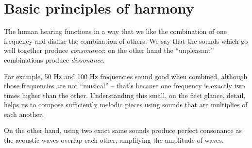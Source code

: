 \documentclass[../sparc.tex]{subfiles}
\begin{document}
\newpage
\section{Basic principles of harmony}

The human hearing functions in a way that we like the combination of one
frequency and dislike the combination of others.  We say that the sounds which
go well together produce \emph{consonance}; on the other hand the ``unpleasant''
combinations produce \emph{dissonance}.

For example, 50 Hz and 100 Hz frequencies sound good when combined, although
those frequencies are not ``musical'' -- that's because one frequency is exactly
two times higher than the other.  Understanding this small, on the first glance,
detail, helps us to compose sufficiently melodic pieces using sounds that are
multiplies of each another.

On the other hand, using two exact same sounds produce perfect consonance as the
acoustic waves overlap each other, amplifying the amplitude of waves.


\end{document}
